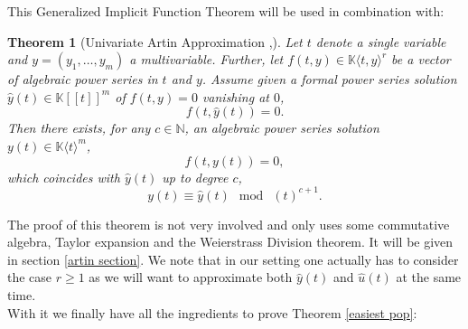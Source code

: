 \documentclass[10pt, a4paper]{article}
\newtheorem{theorem}{Theorem}[section]
\def\wh{\widehat}
\theoremstyle{remark}
\theoremstyle{remark}
\begin{document}
\noindent This Generalized Implicit Function Theorem will be used in combination with:
\begin{theorem}[Univariate Artin Approximation \cite{Greenberg1966},\cite{ARTIN1968}]\label{ArtinAprox}
Let $t$ denote a single variable and $y=(y_1,\ldots,y_m)$ a multivariable. Further, let $f(t, y)\in \mathbb{K}\langle t,y\rangle^r$ be a vector of algebraic power series in $t$ and $y$. Assume given a formal power series solution $\widehat{y}(t)\in\mathbb{K}[[t]]^m$ of $f(t,y)=0$ vanishing at $0$,$$f(t,\widehat{y}(t))=0.$$ Then there exists, for any $c \in \mathbb{N}$, an algebraic power series solution $y(t)\in \mathbb{K}\langle t\rangle^m$,$$f(t, y(t)) = 0,$$ which coincides with $\widehat{y}(t)$ up to degree $c$, $$y(t)\equiv \widehat{y}(t) \: \bmod \:(t)^{c+1}.$$
\end{theorem}
\noindent The proof of this theorem is not very involved and only uses some commutative algebra, Taylor expansion and the Weierstrass Division theorem. It will be given in section \ref{artin section}. We note that in our setting one actually has to consider the case $r\geq 1$ as we will want to approximate both $\wh{y}(t)$ and $\wh{u}(t)$ at the same time.
\\With it we finally have all the ingredients to  prove Theorem \ref{easiest pop}:
\end{document}
